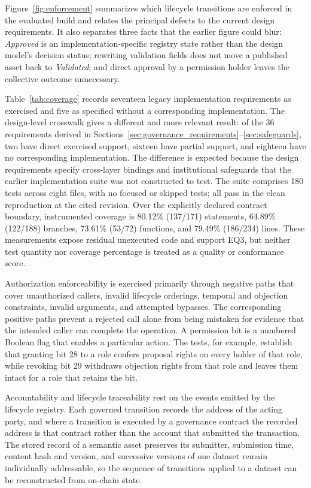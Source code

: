 \documentclass[journal]{IEEEtran}
\begin{document}
Figure~\ref{fig:enforcement} summarizes which lifecycle transitions are
enforced in the evaluated build and relates the principal defects to the
current design requirements. It also separates three facts that the earlier
figure could blur: \emph{Approved} is an implementation-specific registry
state rather than the design model's decision status; rewriting validation
fields does not move a published asset back to \emph{Validated}; and direct
approval by a permission holder leaves the collective outcome unnecessary.

Table~\ref{tab:coverage} records seventeen legacy implementation requirements as exercised and
five as specified without a corresponding implementation. The design-level
crosswalk gives a different and more relevant result: of the 36 requirements
derived in Sections~\ref{sec:governance_requirements}--\ref{sec:safeguards},
two have direct exercised support, sixteen have partial support, and eighteen
have no corresponding implementation. The difference is expected because the
design requirements specify cross-layer bindings and institutional safeguards
that the earlier implementation suite was not constructed to test. The suite
comprises 180 tests across eight files, with no focused or skipped tests; all
pass in the clean reproduction at the cited revision. Over the explicitly
declared contract boundary, instrumented coverage is 80.12\% (137/171)
statements, 64.89\% (122/188) branches, 73.61\% (53/72) functions, and
79.49\% (186/234) lines. These measurements expose residual unexecuted code
and support EQ3, but neither test quantity nor coverage percentage is treated
as a quality or conformance score.

Authorization enforceability is exercised primarily through negative
paths that cover unauthorized callers, invalid lifecycle orderings, temporal
and objection constraints, invalid arguments, and attempted bypasses. The
corresponding positive paths prevent a rejected call alone from being mistaken
for evidence that the intended caller can complete the operation. A permission
bit is a numbered Boolean flag that enables a particular action. The tests,
for example, establish that granting bit 28 to a role confers proposal rights
on every holder of that role, while revoking bit 29 withdraws objection rights
from that role and leaves them intact for a role that retains the bit.

Accountability and lifecycle traceability rest on the events emitted by
the lifecycle registry. Each governed transition records the address of
the acting party, and where a transition is executed by a governance
contract the recorded address is that contract rather than the account
that submitted the transaction. The stored record of a semantic asset
preserves its submitter, submission time, content hash and version, and
successive versions of one dataset remain individually addressable, so
the sequence of transitions applied to a dataset can be reconstructed
from on-chain state.
\end{document}
